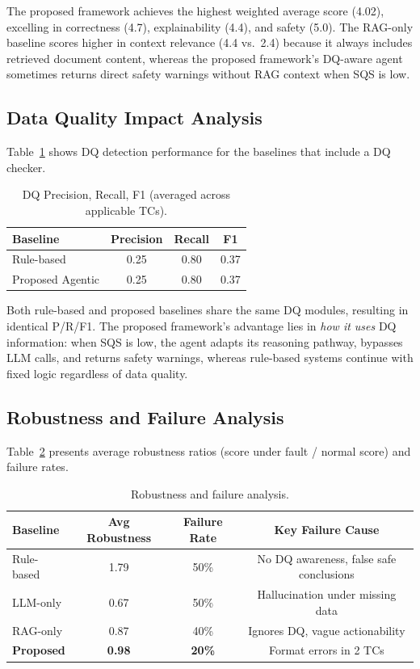 \documentclass[runningheads]{llncs}
\begin{document}
The proposed framework achieves the highest weighted average score (4.02), excelling in correctness (4.7), explainability (4.4), and safety (5.0). The RAG-only baseline scores higher in context relevance (4.4 vs.\ 2.4) because it always includes retrieved document content, whereas the proposed framework's DQ-aware agent sometimes returns direct safety warnings without RAG context when SQS is low.

\subsection{Data Quality Impact Analysis}
Table~\ref{tab:dq} shows DQ detection performance for the baselines that include a DQ checker.

\begin{table}[htbp]
\caption{DQ Precision, Recall, F1 (averaged across applicable TCs).}
\label{tab:dq}
\centering
\begin{tabular}{|l|c|c|c|}
\hline
\textbf{Baseline} & \textbf{Precision} & \textbf{Recall} & \textbf{F1} \\
\hline
Rule-based & 0.25 & 0.80 & 0.37 \\
\hline
Proposed Agentic & 0.25 & 0.80 & 0.37 \\
\hline
\end{tabular}
\end{table}

Both rule-based and proposed baselines share the same DQ modules, resulting in identical P/R/F1. The proposed framework's advantage lies in \textit{how it uses} DQ information: when SQS is low, the agent adapts its reasoning pathway, bypasses LLM calls, and returns safety warnings, whereas rule-based systems continue with fixed logic regardless of data quality.

\subsection{Robustness and Failure Analysis}
Table~\ref{tab:robustness} presents average robustness ratios (score under fault / normal score) and failure rates.

\begin{table}[htbp]
\caption{Robustness and failure analysis.}
\label{tab:robustness}
\centering
\begin{tabular}{|l|c|c|c|}
\hline
\textbf{Baseline} & \textbf{Avg Robustness} & \textbf{Failure Rate} & \textbf{Key Failure Cause} \\
\hline
Rule-based & 1.79 & 50\% & No DQ awareness, false safe conclusions \\
\hline
LLM-only & 0.67 & 50\% & Hallucination under missing data \\
\hline
RAG-only & 0.87 & 40\% & Ignores DQ, vague actionability \\
\hline
\textbf{Proposed} & \textbf{0.98} & \textbf{20\%} & Format errors in 2 TCs \\
\hline
\end{tabular}
\end{table}
\end{document}
